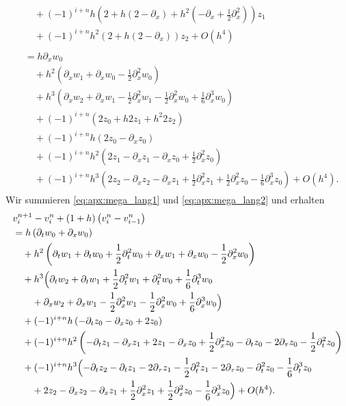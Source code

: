 {\begin{align}
\begin{split}
&\quad + (-1)^{i+n} h \left( 2 + h( 2 - \partial_x ) + h^2  \left( -\partial_x + \frac{1}{2} \partial^2_x \right) \right) z_1\\
&\quad + (-1)^{i+n} h^2 \left( 2 + h( 2 - \partial_x ) \right) z_2 + O(h^4)
\end{split}\\
\label{eq:apx:mega_lang2}
\begin{split} 
&= h \partial_x w_0\\
&\quad + h^2 \left( \partial_x w_1 + \partial_x w_0 - \frac{1}{2} \partial^2_x w_0 \right)\\
&\quad + h^3 \left( \partial_x  w_2 + \partial_x w_1 - \frac{1}{2} \partial^2_x w_1 - \frac{1}{2} \partial^2_x w_0 + \frac{1}{6} \partial^3_x w_0 \right)\\
&\quad + (-1)^{i+n} \left( 2 z_0 + h 2 z_1 + h^2 2 z_2 \right)\\
&\quad + (-1)^{i+n} h \left( 2 z_0 - \partial_x z_0 \right)\\
&\quad + (-1)^{i+n} h^2 \left( 2 z_1 - \partial_x z_1 -\partial_x z_0 + \frac{1}{2} \partial^2_x z_0 \right)\\
&\quad + (-1)^{i+n} h^3 \left( 2 z_2 - \partial_x z_2 -\partial_x z_1 + \frac{1}{2} \partial^2_x z_1 + \frac{1}{2} \partial^2_x z_0 - \frac{1}{6} \partial^3_x z_0 \right) + O(h^4).
\end{split}
\end{align}
}
Wir summieren \eqref{eq:apx:mega_lang1} und \eqref{eq:apx:mega_lang2} und erhalten
\begin{align}\begin{split}
& v^{n+1}_i - v^n_i + (1 + h) \left(v^n_i - v^n_{i-1}\right)\\
&= h \left( \partial_t w_0 + \partial_x w_0 \right)\\
&\quad + h^2\left( \partial_t w_1 + \partial_t w_0 + \frac{1}{2} \partial^2_t w_0 + \partial_x w_1 + \partial_x w_0 - \frac{1}{2} \partial^2_x w_0 \right)\\
&\quad + h^3 \Bigl( \partial_t w_2 + \partial_t w_1 + \frac{1}{2} \partial^2_t w_1 + \partial^2_t w_0 + \frac{1}{6} \partial^3_t w_0\\
&\qquad +  \partial_x  w_2 + \partial_x w_1 - \frac{1}{2} \partial^2_x w_1 - \frac{1}{2} \partial^2_x w_0 + \frac{1}{6} \partial^3_x w_0 \Bigr)\\
&\quad + (-1)^{i+n} h \left( - \partial_t z_0 - \partial_x z_0 + 2 z_0 \right)\\
&\quad + (-1)^{i+n} h^2 \left( - \partial_t z_1 - \partial_x z_1 + 2 z_1 - \partial_x z_0 + \frac{1}{2} \partial^2_x z_0 - \partial_t z_0 - 2 \partial_\tau z_0 - \frac{1}{2} \partial^2_t z_0  \right)\\
&\quad + (-1)^{i+n} h^3 \Bigl( - \partial_t z_2 - \partial_t z_1 - 2 \partial_\tau z_1 - \frac{1}{2} \partial^2_t z_1 - 2 \partial_\tau z_0 - \partial^2_t z_0 - \frac{1}{6} \partial^3_t z_0\\
&\qquad + 2 z_2 - \partial_x z_2 -\partial_x z_1 + \frac{1}{2} \partial^2_x z_1 + \frac{1}{2} \partial^2_x z_0 - \frac{1}{6} \partial^3_x z_0 \Bigr) + O(h^4).
\end{split}
\end{align}
